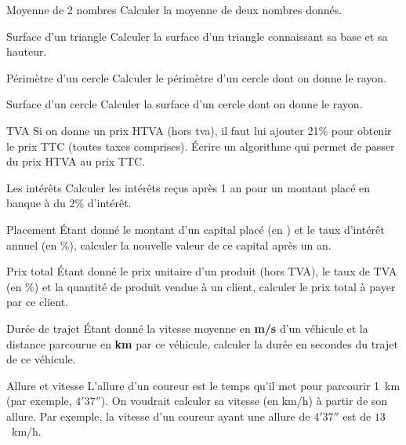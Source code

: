 \begin{Exercice}{Moyenne de 2 nombres}
	Calculer la moyenne de deux nombres donnés.
\end{Exercice}

\begin{Exercice}{Surface d’un triangle}
	Calculer la surface d’un triangle connaissant sa base et sa hauteur.
\end{Exercice}

\begin{Exercice}{Périmètre d’un cercle}
	Calculer le périmètre d’un cercle dont on donne le rayon. 
\end{Exercice}

\begin{Exercice}{Surface d’un cercle}
	Calculer la surface d’un cercle dont on donne le rayon. 
\end{Exercice}

\begin{Exercice}{TVA}
	Si on donne un prix  HTVA (hors tva), il faut lui ajouter 21\% 
	pour obtenir le prix TTC (toutes taxes comprises). Écrire un algorithme 
	qui permet de passer du prix HTVA au prix TTC.
\end{Exercice}

\begin{Exercice}{Les intérêts}
	Calculer les intérêts reçus après 1 an pour un montant placé en 
	banque à du 2\% d’intérêt.
\end{Exercice}

\begin{Exercice}{Placement}
	Étant donné le montant d’un capital placé (en \texteuro) 
	et le taux d’intérêt annuel (en \%), 
	calculer la nouvelle valeur de ce capital après un an.
\end{Exercice}

\begin{Exercice}{Prix total}
	Étant donné le prix unitaire d’un produit
	(hors TVA), le taux de TVA (en \%) et la quantité de produit vendue à
	un client, calculer le prix total à payer par ce client.
\end{Exercice}

\begin{Exercice}{Durée de trajet}
	Étant donné la vitesse moyenne en \textbf{m/s}
	d’un véhicule et la distance parcourue en \textbf{km} par ce véhicule,
	calculer la durée en secondes du trajet de ce véhicule.
\end{Exercice}

\begin{Exercice}{Allure et vitesse}
	L’allure d’un coureur est le temps qu’il met pour parcourir 1~km
	(par exemple, $4'37''$).
	On voudrait calculer sa vitesse (en km/h) à partir de son allure.
	Par exemple, la vitesse d’un coureur ayant une allure de
	$4'37''$ est de $13$~km/h. 
\end{Exercice}

